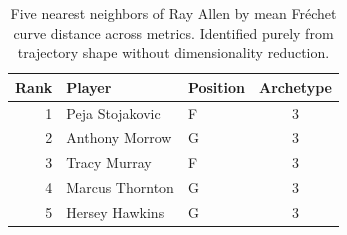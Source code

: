\begin{table}[htbp]
  \centering\small
  \begin{tabular}{rllc}
    \toprule
    Rank & Player & Position & Archetype \\
    \midrule
    1 & Peja Stojakovic & F & 3 \\
    2 & Anthony Morrow & G & 3 \\
    3 & Tracy Murray & F & 3 \\
    4 & Marcus Thornton & G & 3 \\
    5 & Hersey Hawkins & G & 3 \\
    \bottomrule
  \end{tabular}
  \caption{Five nearest neighbors of Ray Allen by mean Fr\'{e}chet curve distance across metrics. Identified purely from trajectory shape without dimensionality reduction.}
  \label{tab:Ray_Allen_frechet_curve_neighbors}
\end{table}

